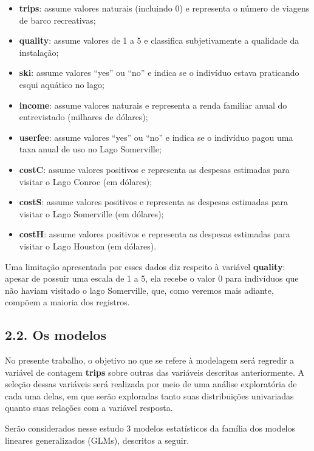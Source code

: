 \documentclass[
]{article}
\providecommand{\tightlist}{%
  \setlength{\itemsep}{0pt}\setlength{\parskip}{0pt}}
\begin{document}
\begin{itemize}
\tightlist
\item
  \textbf{trips}: assume valores naturais (incluindo 0) e representa o
  número de viagens de barco recreativas;
\item
  \textbf{quality}: assume valores de 1 a 5 e classifica subjetivamente
  a qualidade da instalação;
\item
  \textbf{ski}: assume valores ``yes'' ou ``no'' e indica se o indivíduo
  estava praticando esqui aquático no lago;
\item
  \textbf{income}: assume valores naturais e representa a renda familiar
  anual do entrevistado (milhares de dólares);
\item
  \textbf{userfee}: assume valores ``yes'' ou ``no'' e indica se o
  indivíduo pagou uma taxa anual de uso no Lago Somerville;
\item
  \textbf{costC}: assume valores positivos e representa as despesas
  estimadas para visitar o Lago Conroe (em dólares);
\item
  \textbf{costS}: assume valores positivos e representa as despesas
  estimadas para visitar o Lago Somerville (em dólares);
\item
  \textbf{costH}: assume valores positivos e representa as despesas
  estimadas para visitar o Lago Houston (em dólares).
\end{itemize}

Uma limitação apresentada por esses dados diz respeito à variável
\textbf{quality}: apesar de possuir uma escala de 1 a 5, ela recebe o
valor 0 para indivíduos que não haviam visitado o lago Somerville, que,
como veremos mais adiante, compõem a maioria dos registros.

\subsection{2.2. Os modelos}\label{os-modelos}

No presente trabalho, o objetivo no que se refere à modelagem será
regredir a variável de contagem \textbf{trips} sobre outras das
variáveis descritas anteriormente. A seleção dessas variáveis será
realizada por meio de uma análise exploratória de cada uma delas, em que
serão exploradas tanto suas distribuições univariadas quanto suas
relações com a variável resposta.

Serão considerados nesse estudo 3 modelos estatísticos da família dos
modelos lineares generalizados (GLMs), descritos a seguir.
\end{document}
